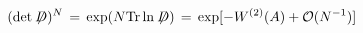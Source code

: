 \begin{equation}\label{eq:fdet}
(\det \not \!\! D)^N \,=\, \exp ( N {\rm Tr} \ln  \not \!\! D )
\,=\, \exp[- W^{(2)}(A) + {\mathcal O}(N^{-1}) ]
\end{equation}

